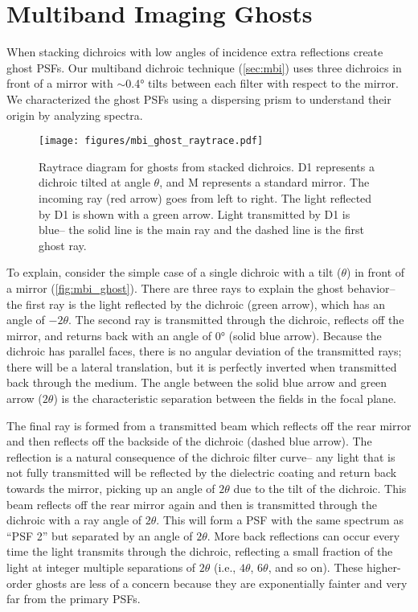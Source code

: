 \section{Multiband Imaging Ghosts}\label{sec:ghosts}

When stacking dichroics with low angles of incidence extra reflections create ghost PSFs. Our multiband dichroic technique (\autoref{sec:mbi}) uses three dichroics in front of a mirror with $\sim$\ang{0.4} tilts between each filter with respect to the mirror. We characterized the ghost PSFs using a dispersing prism to understand their origin by analyzing spectra.
\begin{figure}
    \centering
    \texttt{[image: figures/mbi\_ghost\_raytrace.pdf]}
    \caption{Raytrace diagram for ghosts from stacked dichroics. D1 represents a dichroic tilted at angle $\theta$, and M represents a standard mirror. The incoming ray (red arrow) goes from left to right. The light reflected by D1 is shown with a green arrow. Light transmitted by D1 is blue-- the solid line is the main ray and the dashed line is the first ghost ray.\label{fig:mbi_ghost}}
\end{figure}

To explain, consider the simple case of a single dichroic with a tilt ($\theta$) in front of a mirror (\autoref{fig:mbi_ghost}). There are three rays to explain the ghost behavior-- the first ray is the light reflected by the dichroic (green arrow), which has an angle of $-2\theta$. The second ray is transmitted through the dichroic, reflects off the mirror, and returns back with an angle of \ang{0} (solid blue arrow). Because the dichroic has parallel faces, there is no angular deviation of the transmitted rays; there will be a lateral translation, but it is perfectly inverted when transmitted back through the medium. The angle between the solid blue arrow and green arrow ($2\theta$) is the characteristic separation between the fields in the focal plane.

The final ray is formed from a transmitted beam which reflects off the rear mirror and then reflects off the backside of the dichroic (dashed blue arrow). The reflection is a natural consequence of the dichroic filter curve-- any light that is not fully transmitted will be reflected by the dielectric coating and return back towards the mirror, picking up an angle of $2\theta$ due to the tilt of the dichroic. This beam reflects off the rear mirror again and then is transmitted through the dichroic with a ray angle of $2\theta$. This will form a PSF with the same spectrum as ``PSF 2'' but separated by an angle of $2\theta$. More back reflections can occur every time the light transmits through the dichroic, reflecting a small fraction of the light at integer multiple separations of $2\theta$ (i.e., $4\theta$, $6\theta$, and so on). These higher-order ghosts are less of a concern because they are exponentially fainter and very far from the primary PSFs.

